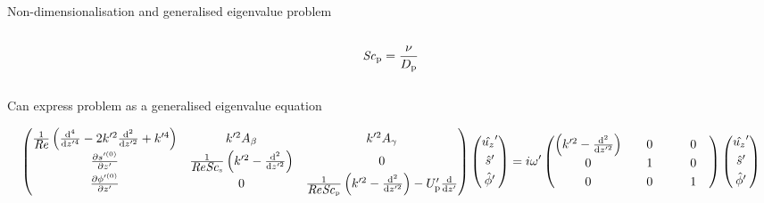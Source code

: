 \documentclass[final]{beamer} %
\newcommand\Rey{\mbox{\textit{Re}}}  %
\newcommand\Sc{\mbox{\textit{Sc}}}  %
\begin{document}
\begin{frame}[t]
\begin{columns}[t]
\begin{column}{0.6\paperwidth}
\begin{block}{Non-dimensionalisation and generalised eigenvalue problem}
\begin{columns}[t]
\begin{column}{0.29\paperwidth}
\begin{columns}[t]
\begin{column}{0.07\paperwidth}
                $$\Sc_{\text{p}} = \frac{\nu}{D_{\text{p}}} $$
              \end{column}
            \end{columns}
        
          \end{column}
        \end{columns}

        \vspace{1cm}

        Can express problem as a generalised eigenvalue equation
        
        $$ \begin{pmatrix}
          \frac{1}{\Rey}\left(\frac{\mathrm{d}^{4}}{\mathrm{d} z'^{4}} - 2 k'^{2} \frac{\mathrm{d}^{2}}{\mathrm{d} z'^{2}} + k'^{4}\right) &  k'^{2} A_{\beta} & k'^{2} A_{\gamma} \\[0.3em]
          \frac{\partial s^{\prime (0)}}{\partial z'} & \frac{1}{\Rey \Sc_{\text{s}}} \left(k'^{2} - \frac{\mathrm{d}^{2}}{\mathrm{d} z'^{2}} \right) & 0 \\[0.3em]
          \frac{\partial \phi^{\prime (0)}}{\partial z'} & 0 & \frac{1}{\Rey \Sc_{\text{p}}} \left(k'^{2} - \frac{\mathrm{d}^{2}}{\mathrm{d} z'^{2}} \right) - U_{\text{p}}' \frac{\mathrm{d}}{\mathrm{d} z'} 
        \end{pmatrix} \begin{pmatrix}
              \hat{u_{z}}^{\prime} \\[0.3em]
              \hat{s}^{\prime} \\[0.3em]
              \hat{\phi}^{\prime}
        \end{pmatrix} = i \omega^{\prime} \begin{pmatrix}
              \left(k^{\prime 2} - \frac{\mathrm{d}^{2}}{\mathrm{d} z'^{2}}\right) &  \quad 0 \quad & \quad 0 \quad \\[0.3em]
              0 & 1 & 0 \\[0.3em]
              0 & 0 & 1
        \end{pmatrix} \begin{pmatrix}
              \hat{u_{z}}^{\prime} \\[0.3em]
              \hat{s}^{\prime} \\[0.3em]
              \hat{\phi}^{\prime}
        \end{pmatrix}$$

        \vspace{1cm}
        

\end{block}
\end{column}
\end{columns}
\end{frame}
\end{document}

